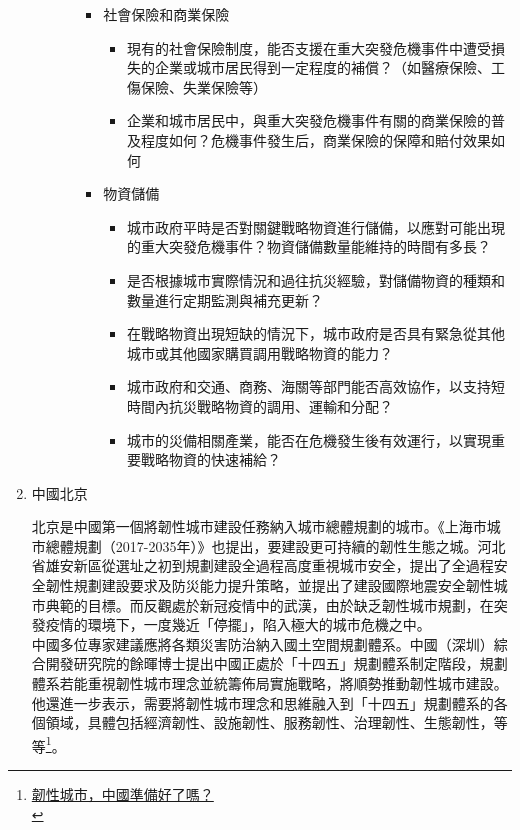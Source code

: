 \documentclass[a4paper,12pt]{article}
\begin{document}
\begin{enumerate}
\begin{enumerate}
\begin{enumerate}
\begin{itemize}
\begin{itemize}
\end{itemize}
\item 社會保險和商業保險
\label{sec:orgeb15a23}
\begin{itemize}
\item 現有的社會保險制度，能否支援在重大突發危機事件中遭受損失的企業或城市居民得到一定程度的補償？（如醫療保險、工傷保險、失業保險等）\\
\item 企業和城市居民中，與重大突發危機事件有關的商業保險的普及程度如何？危機事件發生后，商業保險的保障和賠付效果如何\\
\end{itemize}
\item 物資儲備
\label{sec:orga217a0e}
\begin{itemize}
\item 城市政府平時是否對關鍵戰略物資進行儲備，以應對可能出現的重大突發危機事件？物資儲備數量能維持的時間有多長？\\
\item 是否根據城市實際情況和過往抗災經驗，對儲備物資的種類和數量進行定期監測與補充更新？\\
\item 在戰略物資出現短缺的情況下，城市政府是否具有緊急從其他城市或其他國家購買調用戰略物資的能力？\\
\item 城市政府和交通、商務、海關等部門能否高效協作，以支持短時間內抗災戰略物資的調用、運輸和分配？\\
\item 城市的災備相關產業，能否在危機發生後有效運行，以實現重要戰略物資的快速補給？\\
\end{itemize}
\end{itemize}
\end{enumerate}
\end{enumerate}

\item 中國北京
\label{sec:orgaaaf1e4}

北京是中國第一個將韌性城市建設任務納入城市總體規劃的城市。《上海市城市總體規劃（2017-2035年）》也提出，要建設更可持續的韌性生態之城。河北省雄安新區從選址之初到規劃建設全過程高度重視城市安全，提出了全過程安全韌性規劃建設要求及防災能力提升策略，並提出了建設國際地震安全韌性城市典範的目標。而反觀處於新冠疫情中的武漢，由於缺乏韌性城市規劃，在突發疫情的環境下，一度幾近「停擺」，陷入極大的城市危機之中。\\

中國多位專家建議應將各類災害防治納入國土空間規劃體系。中國（深圳）綜合開發研究院的餘暉博士提出中國正處於「十四五」規劃體系制定階段，規劃體系若能重視韌性城市理念並統籌佈局實施戰略，將順勢推動韌性城市建設。他還進一步表示，需要將韌性城市理念和思維融入到「十四五」規劃體系的各個領域，具體包括經濟韌性、設施韌性、服務韌性、治理韌性、生態韌性，等等\footnote{\href{http://chla.com.cn/htm/2020/0317/274871.html}{韌性城市，中國準備好了嗎？}\\}。\\


\end{enumerate}
\end{document}
